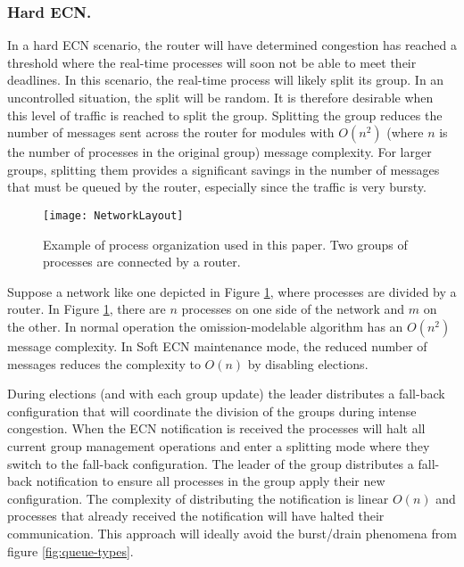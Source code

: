 \subsubsection{Hard \ac{ECN}.}

In a hard \ac{ECN} scenario, the router will have determined congestion has reached a threshold where the real-time processes will soon not be able to meet their deadlines.
In this scenario, the real-time process will likely split its group.
In an uncontrolled situation, the split will be random.
It is therefore desirable when this level of traffic is reached to split the group.
Splitting the group reduces the number of messages sent across the router for modules with $O(n^2)$ (where $n$ is the number of processes in the original group) message complexity.
For larger groups, splitting them provides a significant savings in the number of messages that must be queued by the router, especially since the traffic is very bursty.

\begin{figure}
\centering
\texttt{[image: NetworkLayout]}
\caption{Example of process organization used in this paper. Two groups of processes are connected by a router.} \label{fig:network-layout}
\end{figure}

Suppose a network like one depicted in Figure \ref{fig:network-layout}, where processes are divided by a router.
In Figure \ref{fig:network-layout}, there are $n$ processes on one side of the network and $m$ on the other.
In normal operation the omission-modelable algorithm has an $O(n^2)$ message complexity.
In Soft \ac{ECN} maintenance mode, the reduced number of messages reduces the complexity to $O(n)$ by disabling elections.

During elections (and with each group update) the leader distributes a fall-back configuration that will coordinate the division of the groups during intense congestion.
When the \ac{ECN} notification is received the processes will halt all current group management operations and enter a splitting mode where they switch to the fall-back configuration.
The leader of the group distributes a fall-back notification to ensure all processes in the group apply their new configuration. 
The complexity of distributing the notification is linear $O(n)$ and processes that already received the notification will have halted their communication.
This approach will ideally avoid the burst/drain phenomena from figure \ref{fig:queue-types}.

